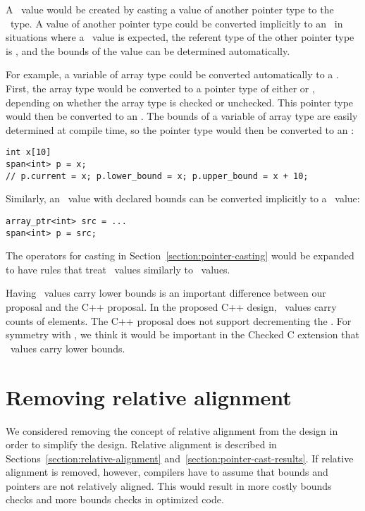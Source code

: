 A \spanptrT\ value would be created by casting a value of another pointer type to the
\spanptrT\ type. A
value of another pointer type could be converted implicitly to an
\spanptrT\ in
situations where a
\spanptrT\ value is
expected, the referent type of the other pointer type is , and
the bounds of the value can be determined automatically.

For example, a variable of array type could be converted automatically to
a \spanptr. First, the array type would be converted to a
pointer type of either  \code{*} or
\arrayptrT , depending
on whether the array type is checked or unchecked. This pointer type
would then be converted to an
\spanptrT. The
bounds of a variable of array type are easily determined at compile
time, so the pointer type would then be converted to an
\spanptrT:

\begin{lstlisting}
int x[10]
span<int> p = x;
// p.current = x; p.lower_bound = x; p.upper_bound = x + 10;

\end{lstlisting}

Similarly, an \arrayptr\ value with declared bounds can be
converted implicitly to a \spanptr\ value:

\begin{lstlisting}
array_ptr<int> src = ...
span<int> p = src;
\end{lstlisting}

The operators for casting in Section~\ref{section:pointer-casting} would be expanded
to have rules that treat \spanptr\ values similarly to \arrayptr\ values.

Having \spanptr\ values carry lower bounds is an important difference between our
proposal and the C++ proposal.   In the proposed C++ design, \spanptr\ values
carry counts of elements.  The C++ proposal does not
support decrementing the \spanptr.   For symmetry with \arrayptr, we think it
would be important in the Checked C extension that \spanptr\ values carry lower bounds.


\section{Removing relative alignment}
\label{section:design-alternatives:always-unaligned}

We considered removing the concept of relative alignment from the design in order
to simplify the design. 
Relative alignment is described in Sections~\ref{section:relative-alignment}
and~\ref{section:pointer-cast-results}.  If relative alignment
is removed, however, compilers have to assume that bounds and pointers are
not relatively aligned.   This would result in more costly bounds checks and
more bounds checks in optimized code.

